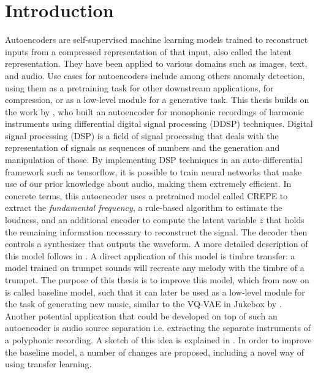 \chapter{Introduction}


Autoencoders are self-supervised machine learning models trained to reconstruct inputs from a compressed representation of that input, also called the latent representation.
They have been applied to various domains such as images, text, and audio.
Use cases for autoencoders include among others anomaly detection, using them as a pretraining task for other downstream applications, for compression, or as a low-level module for a generative task. \newline
This thesis builds on the work by \citet{ddsp}, who built an autoencoder for monophonic recordings of harmonic instruments using differential digital signal processing (DDSP) techniques.
Digital signal processing (DSP) is a field of signal processing that deals with the representation of signals as sequences of numbers and the generation and manipulation of those.
By implementing DSP techniques in an auto-differential framework such as tensorflow, it is possible to train neural networks that make use of our prior knowledge about audio, making them extremely efficient. \newline
In concrete terms, this autoencoder uses a pretrained model called CREPE to extract the \textit{fundamental frequency}, a rule-based algorithm to estimate the loudness, and an additional encoder to compute the latent variable $z$ that holds the remaining information necessary to reconstruct the signal. The decoder then controls a synthesizer that outputs the waveform. A more detailed description of this model follows in . \newline
A direct application of this model is timbre transfer: a model trained on trumpet sounds will recreate any melody with the timbre of a trumpet.
The purpose of this thesis is to improve this model, which from now on is called baseline model, such that it can later be used as a low-level module for the task of generating new music, similar to the VQ-VAE in Jukebox by \citet{jukebox}.
Another potential application that could be developed on top of such an autoencoder is audio source separation i.e. extracting the separate instruments of a polyphonic recording. A sketch of this idea is explained in . \newline
In order to improve the baseline model, a number of changes are proposed, including a novel way of using transfer learning.
